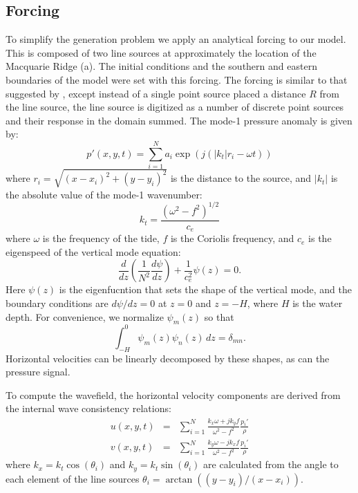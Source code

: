 \documentclass[12pt]{article}
\begin{document}
%
%
%
%
%
%
%

\subsection{Forcing}

To simplify the generation problem we apply an analytical forcing to our model.  This is composed of two line sources at approximately the location of the Macquarie Ridge (a).  The initial conditions and the southern and eastern boundaries of the model were set with this forcing.  The forcing is similar to that suggested by \citet{rainvilleetal10}, except instead of a single point source placed a distance $R$ from the line source, the line source is digitized as a number of discrete point sources and their response in the domain summed.  The mode-1 pressure anomaly is given by:
\begin{equation}
  p'(x,y,t)=\sum_{i=1}^{N}  a_i \exp\left(j\left(|k_t|r_i - \omega t\right)\right)
\end{equation}
where $r_i=\sqrt{\left(x-x_i\right)^2+\left(y-y_i\right)^2}$ is the distance to the source, and $|k_t|$ is the absolute value of the mode-1 wavenumber:
\begin{equation}
  k_t = \frac{\left(\omega^2-f^2\right)^{1/2}}{c_e}
\end{equation}
where $\omega$ is the frequency of the tide, $f$ is the Coriolis frequency, and $c_e$ is the eigenspeed of the vertical mode equation:
\begin{equation}
  \frac{d}{dz}\left(\frac{1}{N^2}\frac{d\psi}{dz}\right)
 + \frac{1}{c_e^2}\psi(z)=0.
\end{equation}
Here $\psi(z)$ is the eigenfucntion that sets the shape of the vertical mode, and the boundary conditions are $d\psi/dz=0$ at $z=0$ and $z=-H$, where $H$ is the water depth.  For convenience, we normalize $\psi_m(z)$ so that 
\begin{equation}
  \int_{-H}^0 \psi_m(z)\psi_n(z)\, dz = \delta_{mn}.
\end{equation}
Horizontal velocities can be linearly decomposed by these shapes, as can the pressure signal.  

To compute the wavefield, the horizontal velocity components are derived from the internal wave consistency relations: 
\begin{eqnarray}
  u(x,y,t) & = &\sum_{i=1}^{N}  \frac{k_x\omega + j k_y f}{\omega^2-f^2} \frac{p_i'}{\rho}\\
  v(x,y,t) &=& \sum_{i=1}^{N}  \frac{k_y\omega - j k_x f}{\omega^2-f^2} \frac{p_i'}{\rho} 
\end{eqnarray}
where $k_x=k_t\cos(\theta_i)$ and $k_y=k_t\sin(\theta_i)$ are calculated from the angle to  each element of the line sources $\theta_i = \arctan((y-y_i)/(x-x_i))$.  
\end{document}

